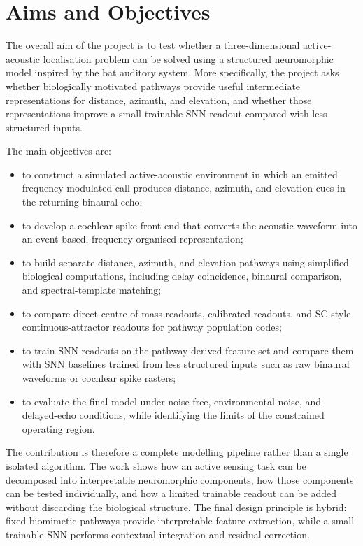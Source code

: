\section{Aims and Objectives}

The overall aim of the project is to test whether a three-dimensional active-acoustic localisation problem can be solved using a structured neuromorphic model inspired by the bat auditory system. More specifically, the project asks whether biologically motivated pathways provide useful intermediate representations for distance, azimuth, and elevation, and whether those representations improve a small trainable SNN readout compared with less structured inputs.

The main objectives are:
\begin{itemize}
    \item to construct a simulated active-acoustic environment in which an emitted frequency-modulated call produces distance, azimuth, and elevation cues in the returning binaural echo;
    \item to develop a cochlear spike front end that converts the acoustic waveform into an event-based, frequency-organised representation;
    \item to build separate distance, azimuth, and elevation pathways using simplified biological computations, including delay coincidence, binaural comparison, and spectral-template matching;
    \item to compare direct centre-of-mass readouts, calibrated readouts, and SC-style continuous-attractor readouts for pathway population codes;
    \item to train SNN readouts on the pathway-derived feature set and compare them with SNN baselines trained from less structured inputs such as raw binaural waveforms or cochlear spike rasters;
    \item to evaluate the final model under noise-free, environmental-noise, and delayed-echo conditions, while identifying the limits of the constrained operating region.
\end{itemize}

The contribution is therefore a complete modelling pipeline rather than a single isolated algorithm. The work shows how an active sensing task can be decomposed into interpretable neuromorphic components, how those components can be tested individually, and how a limited trainable readout can be added without discarding the biological structure. The final design principle is hybrid: fixed biomimetic pathways provide interpretable feature extraction, while a small trainable SNN performs contextual integration and residual correction.


